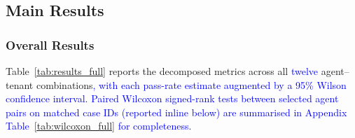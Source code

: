 \subsection{Main Results}
\label{sec:main-results}

\subsubsection{Overall Results}
\label{sec:overall-results}

Table~\ref{tab:results_full} reports the decomposed metrics across all \textcolor{blue}{twelve} agent--tenant combinations\textcolor{blue}{, with each pass-rate estimate augmented by a 95\% Wilson confidence interval. Paired Wilcoxon signed-rank tests between selected agent pairs on matched case IDs (reported inline below) are summarised in Appendix Table~\ref{tab:wilcoxon_full} for completeness.}

